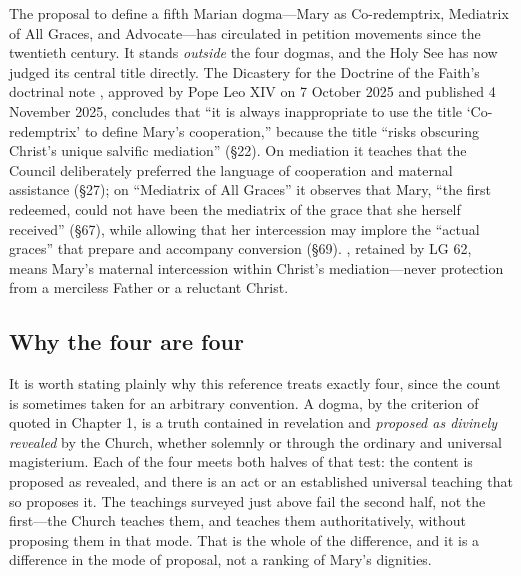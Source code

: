 The proposal to define a fifth Marian dogma---Mary as Co-redemptrix,
Mediatrix of All Graces, and Advocate---has circulated in petition
movements since the twentieth century. It stands \emph{outside} the four
dogmas, and the Holy See has now judged its central title directly. The
Dicastery for the Doctrine of the Faith's doctrinal note , approved by Pope Leo XIV on 7 October 2025 and published
4 November 2025, concludes that ``it is always inappropriate to use the
title `Co-redemptrix' to define Mary's cooperation,'' because the title
``risks obscuring Christ's unique salvific mediation'' (\S22). On
mediation it teaches that the Council deliberately preferred the language
of cooperation and maternal assistance (\S27); on ``Mediatrix of All
Graces'' it observes that Mary, ``the first redeemed, could not have been
the mediatrix of the grace that she herself received'' (\S67), while
allowing that her intercession may implore the ``actual graces'' that
prepare and accompany conversion (\S69). , retained by LG 62, means Mary's maternal
intercession within Christ's mediation---never protection from a
merciless Father or a reluctant Christ.

\subsection*{Why the four are four}

It is worth stating plainly why this reference treats exactly four, since
the count is sometimes taken for an arbitrary convention. A dogma, by the
criterion of  quoted in Chapter 1, is a truth contained
in revelation and \emph{proposed as divinely revealed} by the Church,
whether solemnly or through the ordinary and universal magisterium. Each
of the four meets both halves of that test: the content is proposed as
revealed, and there is an act or an established universal teaching that
so proposes it. The teachings surveyed just above fail the second half,
not the first---the Church teaches them, and teaches them
authoritatively, without proposing them in that mode. That is the whole
of the difference, and it is a difference in the mode of proposal, not a
ranking of Mary's dignities.

